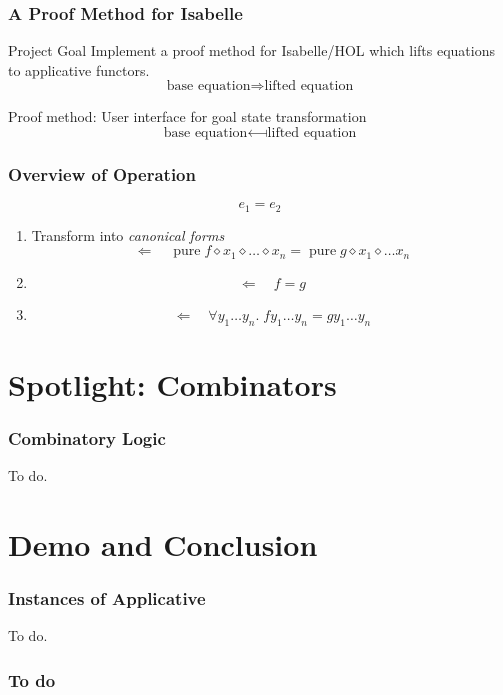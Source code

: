 \documentclass{beamer}
\DeclareMathOperator{\pure}{pure}
\newcommand{\ap}{\diamond}
\begin{document}
\begin{frame}
\frametitle{A Proof Method for Isabelle}

\begin{block}{Project Goal}
Implement a proof method for Isabelle/HOL which lifts equations to
applicative functors.
\[ \text{base equation} \Longrightarrow \text{lifted equation} \]
\end{block}

\vspace{5mm}
Proof method: User interface for goal state transformation
\[ \text{base equation} \longmapsfrom \text{lifted equation} \]
\end{frame}

\begin{frame}
\frametitle{Overview of Operation}

\[ e_1 = e_2 \]
\begin{enumerate}
\item Transform into \emph{canonical forms}
\[ \Longleftarrow\quad \pure f \ap x_1 \ap \dots \ap x_n = \pure g \ap x_1 \ap \dots x_n \]
\item \[ \Longleftarrow\quad f = g \]
\item \[ \Longleftarrow\quad \forall y_1 \dots y_n. \; f y_1 \dots y_n = g y_1 \dots y_n \]
\end{enumerate}
\end{frame}


\section{Spotlight: Combinators} %

\begin{frame}
\frametitle{Combinatory Logic}
To do.
\end{frame}

\section{Demo and Conclusion} %

\begin{frame}
\frametitle{Instances of Applicative}
To do.
\end{frame}

\begin{frame}
\frametitle{To do}
\end{frame}
\end{document}
